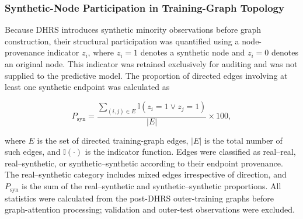 \documentclass[pdflatex,sn-mathphys-num]{sn-jnl}%
\theoremstyle{thmstyleone}%
\theoremstyle{thmstyletwo}%
\theoremstyle{thmstylethree}%
\begin{document}
\subsubsection{Synthetic-Node Participation in Training-Graph Topology}
\label{subsubsec:synthetic_graph_audit}

 {
Because DHRS introduces synthetic minority observations before graph
construction, their structural participation was quantified using a
node-provenance indicator \(z_i\), where \(z_i=1\) denotes a synthetic node
and \(z_i=0\) denotes an original node. This indicator was retained exclusively
for auditing and was not supplied to the predictive model. The proportion of
directed edges involving at least one synthetic endpoint was calculated as
}

{ 
\begin{equation}
P_{\mathrm{syn}}
=
\frac{
\displaystyle
\sum_{(i,j)\in E}
\mathbb{I}\!\left(z_i=1 \lor z_j=1\right)
}{
|E|
}
\times 100,
\label{eq:synthetic_edge_proportion}
\end{equation}
}

 {
where \(E\) is the set of directed training-graph edges, \(|E|\) is the total
number of such edges, and \(\mathbb{I}(\cdot)\) is the indicator function.
Edges were classified as real--real, real--synthetic, or
synthetic--synthetic according to their endpoint provenance. The
real--synthetic category includes mixed edges irrespective of direction, and
\(P_{\mathrm{syn}}\) is the sum of the real--synthetic and
synthetic--synthetic proportions. All statistics were calculated from the
post-DHRS outer-training graphs before graph-attention processing; validation
and outer-test observations were excluded.
}

\begingroup
 
\end{document}
